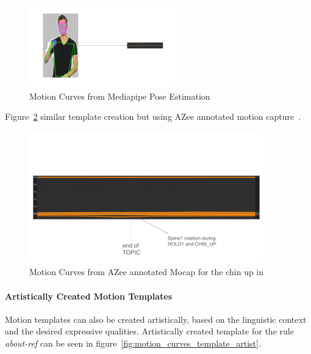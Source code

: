 \documentclass[../../main.tex]{subfiles}
\begin{document}
\begin{figure}
    \centering \includegraphics[width = 2.5in]{chapters/intermediate_blocks_pose_correction/images/motion_curves_mediapipe.png}
    \caption{Motion Curves from Mediapipe Pose Estimation}
    \label{fig:motion_curves_mediapipe}
\end{figure}

Figure~\ref{fig:motion_curves_mocap} similar template creation but using AZee annotated motion capture~\cite{bertin2022rosetta}.

\begin{figure}
    \centering \includegraphics[width = 4in]{chapters/intermediate_blocks_pose_correction/images/motion_curves_mocap.png}
    \caption{Motion Curves from AZee annotated Mocap for the chin up in }
    \label{fig:motion_curves_mocap}
\end{figure}

\paragraph{Artistically Created Motion Templates}
\label{ch:intermediate_blocks_pose_correction:creating_motion_templates:artisitic}

Motion templates can also be created artistically, based on the linguistic context and the desired expressive qualities. Artistically created template for the rule \emph{about-ref} can be seen in figure~\ref{fig:motion_curves_template_artist}.
\end{document}
